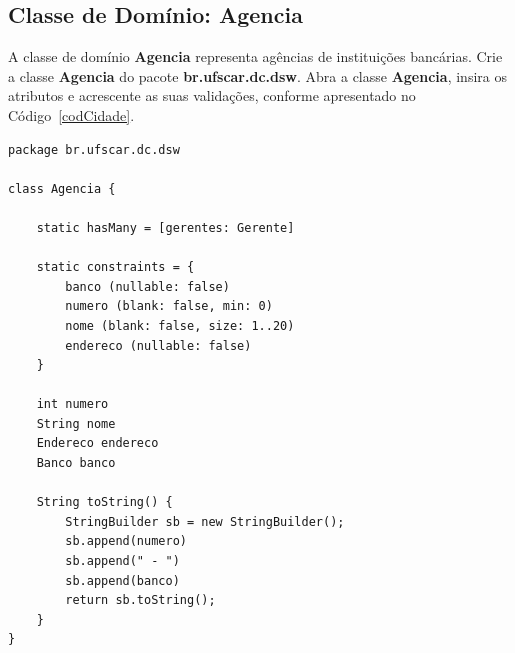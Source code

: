 \newpage

\subsection{Classe de Domínio: Agencia}\label{secAgencia}

\vspace{0.5cm}

A  classe   de  domínio  {\bf  Agencia}  representa   agências  de  instituições
bancárias. Crie a classe {\bf Agencia} do pacote {\bf br.ufscar.dc.dsw}.  Abra a
classe  {\bf Agencia},  insira os  atributos  e acrescente  as suas  validações,
conforme apresentado no Código~\ref{codCidade}. 

\begin{lstlisting}[caption=Classe  de  domínio  {\bf  Agencia},  frame  =  trBL,
    float=htbp, label=codAgencia] 
package br.ufscar.dc.dsw

class Agencia {

    static hasMany = [gerentes: Gerente]

    static constraints = {
        banco (nullable: false)
        numero (blank: false, min: 0)
        nome (blank: false, size: 1..20)
        endereco (nullable: false)
    }

    int numero
    String nome
    Endereco endereco
    Banco banco

    String toString() {
        StringBuilder sb = new StringBuilder();
        sb.append(numero)
        sb.append(" - ")
        sb.append(banco)
        return sb.toString();
    }
}
\end{lstlisting}

\hspace{1cm}\\
\hspace{1cm}\\

